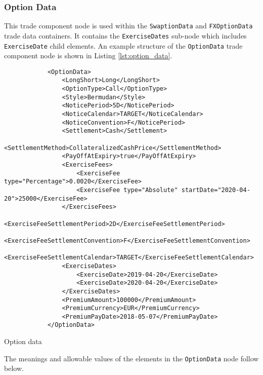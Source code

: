 \subsubsection{Option Data}
\label{ss:option_data} 
This trade component node is used within the \lstinline!SwaptionData! and \lstinline!FXOptionData! trade data
containers. It contains the \lstinline!ExerciseDates! sub-node which includes \lstinline!ExerciseDate! child
elements. An example structure of the \lstinline!OptionData! trade component node is shown in Listing
\ref{lst:option_data}.

\begin{listing}[H]
\begin{verbatim}
            <OptionData>
                <LongShort>Long</LongShort>
                <OptionType>Call</OptionType>
                <Style>Bermudan</Style>
                <NoticePeriod>5D</NoticePeriod>
                <NoticeCalendar>TARGET</NoticeCalendar>
                <NoticeConvention>F</NoticePeriod>
                <Settlement>Cash</Settlement>
                <SettlementMethod>CollateralizedCashPrice</SettlementMethod>
                <PayOffAtExpiry>true</PayOffAtExpiry>
                <ExerciseFees>
                    <ExerciseFee type="Percentage">0.0020</ExerciseFee>
                    <ExerciseFee type="Absolute" startDate="2020-04-20">25000</ExerciseFee>
                </ExerciseFees>
                <ExerciseFeeSettlementPeriod>2D</ExerciseFeeSettlementPeriod>
                <ExerciseFeeSettlementConvention>F</ExerciseFeeSettlementConvention>
                <ExerciseFeeSettlementCalendar>TARGET</ExerciseFeeSettlementCalendar>
                <ExerciseDates>
                    <ExerciseDate>2019-04-20</ExerciseDate>
                    <ExerciseDate>2020-04-20</ExerciseDate>
                </ExerciseDates>
                <PremiumAmount>100000</PremiumAmount> 
                <PremiumCurrency>EUR</PremiumCurrency>            
                <PremiumPayDate>2018-05-07</PremiumPayDate>  
            </OptionData>
\end{verbatim}
\caption{Option data}
\label{lst:option_data}
\end{listing}

The meanings and allowable values of the elements in the \lstinline!OptionData! node follow below.

